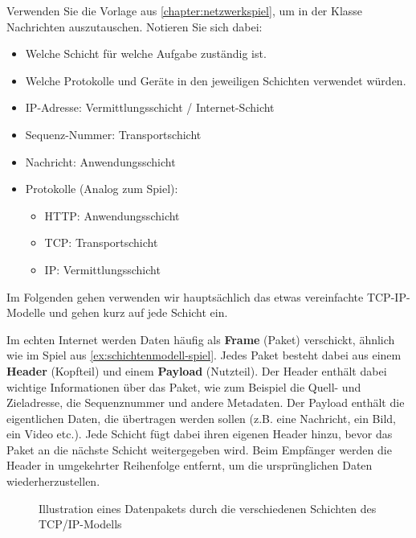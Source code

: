 \begin{myexercise}[Netzwerkspiel]\label{ex:schichtenmodell-spiel}
	Verwenden Sie die Vorlage aus \ref{chapter:netzwerkspiel}, um in der Klasse Nachrichten auszutauschen. Notieren Sie sich dabei:
	\begin{itemize}
		\item Welche Schicht für welche Aufgabe zuständig ist.
		\item Welche Protokolle und Geräte in den jeweiligen Schichten verwendet würden.
	\end{itemize}
	\begin{myanswer}
		\begin{itemize}
			\item \gls{IP}-Adresse: Vermittlungsschicht / Internet-Schicht
			\item Sequenz-Nummer: Transportschicht
			\item Nachricht: Anwendungsschicht
			\item Protokolle (Analog zum Spiel):
			      \begin{itemize}
				      \item \gls{HTTP}: Anwendungsschicht
				      \item \gls{TCP}: Transportschicht
				      \item \gls{IP}: Vermittlungsschicht
			      \end{itemize}
		\end{itemize}
	\end{myanswer}
\end{myexercise}

Im Folgenden gehen verwenden wir hauptsächlich das etwas vereinfachte \acrfull{TCP}-\acrfull{IP}-Modelle und gehen kurz auf jede Schicht ein.

Im echten Internet werden Daten häufig als \textbf{Frame} (Paket) verschickt, ähnlich wie im Spiel aus \cref{ex:schichtenmodell-spiel}. Jedes Paket besteht dabei aus einem \textbf{Header} (Kopfteil) und einem \textbf{Payload} (Nutzteil). Der Header enthält dabei wichtige Informationen über das Paket, wie zum Beispiel die Quell- und Zieladresse, die Sequenznummer und andere Metadaten. Der Payload enthält die eigentlichen Daten, die übertragen werden sollen (z.B. eine Nachricht, ein Bild, ein Video etc.). Jede Schicht fügt dabei ihren eigenen Header hinzu, bevor das Paket an die nächste Schicht weitergegeben wird. Beim Empfänger werden die Header in umgekehrter Reihenfolge entfernt, um die ursprünglichen Daten wiederherzustellen.

\begin{figure}[H]
	\centering
	
	\caption{Illustration eines Datenpakets durch die verschiedenen Schichten des \gls{TCP}/\gls{IP}-Modells}
\end{figure}


